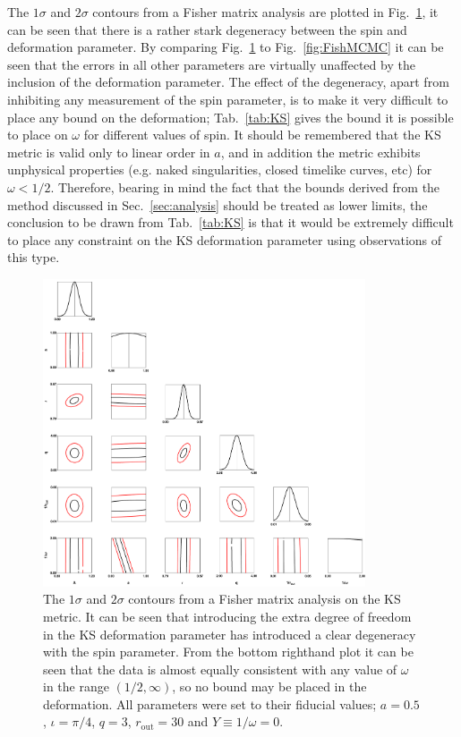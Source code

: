 The $1\sigma$ and $2\sigma$ contours from a Fisher matrix analysis are plotted in Fig.\ \ref{fig:KSFish}, it can be seen that there is a rather stark degeneracy between the spin and deformation parameter. By comparing Fig.\ \ref{fig:KSFish} to Fig.\ \ref{fig:FishMCMC} it can be seen that the errors in all other parameters are virtually unaffected by the inclusion of the deformation parameter. The effect of the degeneracy, apart from inhibiting any measurement of the spin parameter, is to make it very difficult to place any bound on the deformation; Tab.\ \ref{tab:KS} gives the bound it is possible to place on $\omega$ for different values of spin. It should be remembered that the KS metric is valid only to linear order in $a$, and in addition the metric exhibits unphysical properties (e.g. naked singularities, closed timelike curves, etc) for $\omega < 1/2$. Therefore, bearing in mind the fact that the bounds derived from the method discussed in Sec.\ \ref{sec:analysis} should be treated as lower limits, the conclusion to be drawn from Tab.\ \ref{tab:KS} is that it would be extremely difficult to place any constraint on the KS deformation parameter using observations of this type.

\begin{figure}[t]
 \centering
 \includegraphics[trim=0cm 0cm 0cm 0cm, width=0.85\textwidth]{KSFisherPlot.pdf}
 \caption{The $1\sigma$ and $2\sigma$ contours from a Fisher matrix analysis on the KS metric. It can be seen that introducing the extra degree of freedom in the KS deformation parameter has introduced a clear degeneracy with the spin parameter. From the bottom righthand plot it can be seen that the data is almost equally consistent with any value of $\omega$ in the range $(1/2,\infty)$, so no bound may be placed in the deformation. All parameters were set to their fiducial values; $a=0.5$, $\iota=\pi/4$, $q=3$, $r_{\textrm{out}}=30$ and $Y\equiv 1/\omega=0$.}
 \label{fig:KSFish}
\end{figure}

